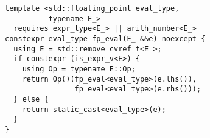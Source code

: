 \begin{lstlisting}[basicstyle=\small\ttfamily]
template <std::floating_point eval_type,
          typename E_>
  requires expr_type<E_> || arith_number<E_>
constexpr eval_type fp_eval(E_ &&e) noexcept {
  using E = std::remove_cvref_t<E_>;
  if constexpr (is_expr_v<E>) {
    using Op = typename E::Op;
    return Op()(fp_eval<eval_type>(e.lhs()),
                fp_eval<eval_type>(e.rhs()));
  } else {
    return static_cast<eval_type>(e);
  }
}
\end{lstlisting}
